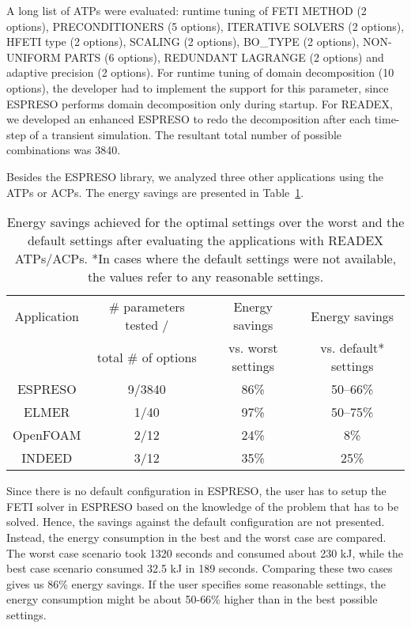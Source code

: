 A long list of ATPs were evaluated: runtime tuning of FETI METHOD (2 options), PRECONDITIONERS (5 options), ITERATIVE SOLVERS (2 options), HFETI type (2 options), SCALING (2 options), BO\_TYPE (2 options), NON-UNIFORM PARTS (6 options), REDUNDANT LAGRANGE (2 options) and adaptive precision (2 options). For runtime tuning of domain decomposition (10 options), the developer had to implement the support for this parameter, since ESPRESO performs domain decomposition only during startup. For READEX, we developed an enhanced ESPRESO to redo the decomposition after each time-step of a transient simulation. The resultant total number of possible combinations was 3840.

Besides the ESPRESO library, we analyzed three other applications using the ATPs or ACPs. The energy savings are presented in Table~\ref{tab:ATPACP}.

\begin{table}[h]
    \centering

    \begin{tabular}{|c|c|c|c|}
    \hline
Application & \# parameters tested /& Energy savings     & Energy savings \\
            & total \# of options      & vs. worst settings & vs. default* settings\\
\hline
ESPRESO     & 9/3840 & 86\% & 50--66\% \\ \hline
ELMER       & 1/40   & 97\% & 50--75\% \\ \hline
OpenFOAM    & 2/12   & 24\% &      8\% \\ \hline
INDEED      & 3/12   & 35\% &     25\% \\ \hline

    \end{tabular}
    \caption{Energy savings achieved for the optimal settings over the worst and the default settings after evaluating the  applications with READEX ATPs/ACPs. *In cases where the default settings were not available, the values refer to any reasonable settings.}
    \label{tab:ATPACP}
\end{table}

Since there is no default configuration in ESPRESO, the user has to setup the FETI solver in ESPRESO based on the knowledge of the problem that has to be solved. Hence, the savings against the default configuration are not presented. Instead, the energy consumption in the best and the worst case are compared. The worst case scenario took 1320 seconds and consumed about 230 kJ, while the best case scenario consumed 32.5 kJ in 189 seconds. Comparing these two cases gives us 86\% energy savings. If the user specifies some reasonable settings, the energy consumption might be about 50-66\% higher than in the best possible settings.
